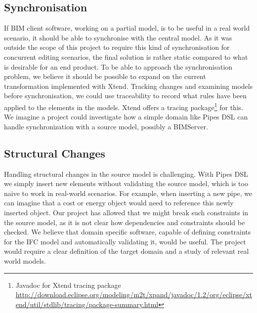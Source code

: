 \subsection{Synchronisation}
If BIM client software, working on a partial model, is to be useful in a real world scenario, it should be able to synchronise with the central model. As it was outside the scope of this project to require this kind of synchronisation for concurrent editing scenarios, the final solution is rather static compared to what is desirable for an end product. To be able to approach the synchronisation problem, we believe it should be possible to expand on the current transformation implemented with Xtend. Tracking changes and examining models before synchronisation, we could use traceability\cite{czarnecki06} to record what rules have been applied to the elements in the models. Xtend offers a tracing package\footnote{Javadoc for Xtend tracing package \url{http://download.eclipse.org/modeling/m2t/xpand/javadoc/1.2/org/eclipse/xtend/util/stdlib/tracing/package-summary.html}} for this. We imagine a project could investigate how a simple domain like Pipes DSL can handle synchronization with a source model, possibly a BIMServer.

\subsection{Structural Changes}
Handling structural changes in the source model is challenging. With Pipes DSL we simply insert new elements without validating the source model, which is too naive to work in real-world scenarios. For example, when inserting a new pipe, we can imagine that a cost or energy object would need to reference this newly inserted object. Our project has allowed that we might break such constraints in the source model, as it is not clear how dependencies and constraints should be checked. We believe that domain specific software, capable of defining constraints for the IFC model and automatically validating it, would be useful. The project would require a clear definition of the target domain and a study of relevant real world models.
